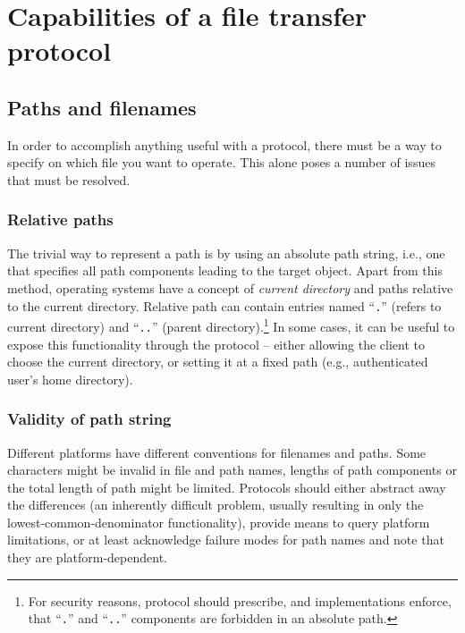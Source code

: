 
\section{Capabilities of a file transfer protocol}

\subsection{Paths and filenames}

In order to accomplish anything useful with a protocol, there must be a way to specify on which file you want
to operate. This alone poses a number of issues that must be resolved.

\subsubsection{Relative paths}

The trivial way to represent a path is by using an absolute path string, i.e., one that specifies all path
components leading to the target object. Apart from this method, operating systems have a concept of {\it
current directory} and paths relative to the current directory. Relative path can contain entries named
``\texttt{.}'' (refers to current directory) and ``\texttt{..}'' (parent directory).\footnote{For security
reasons, protocol should prescribe, and implementations enforce, that ``\texttt{.}'' and ``\texttt{..}''
components are forbidden in an absolute path.} In some cases, it can be useful to expose this functionality
through the protocol -- either allowing the client to choose the current directory, or setting it at a fixed
path (e.g., authenticated user's home directory).

\subsubsection{Validity of path string}

Different platforms have different conventions for filenames and paths. Some characters might be invalid in
file and path names, lengths of path components or the total length of path might be limited. Protocols should
either abstract away the differences (an inherently difficult problem, usually resulting in only the
lowest-common-denominator functionality), provide means to query platform limitations, or at least acknowledge
failure modes for path names and note that they are platform-dependent.

